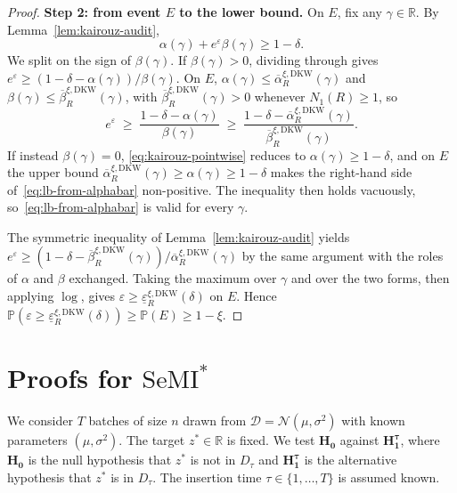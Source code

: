 \documentclass{article}
\theoremstyle{plain}
\theoremstyle{definition}
\theoremstyle{remark}
\newcommand{\RR}{\ensuremath{\mathbb{R}}}
\newcommand{\cN}{\ensuremath{\mathcal{N}}}
\newcommand{\cD}{\ensuremath{\mathcal{D}}}
\renewcommand{\leq}{\leqslant}
\renewcommand{\geq}{\geqslant}
\newcommand{\SeMIstar}{\mathrm{SeMI}^{\ast}}
\newcommand{\bP}{\mathbb{P}}
\begin{document}
\begin{proof}
    \textbf{Step 2: from event $E$ to the lower bound.}
    On $E$, fix any $\gamma \in \RR$. By Lemma~\ref{lem:kairouz-audit},
    \begin{equation}\label{eq:kairouz-pointwise}
        \alpha(\gamma) + e^\varepsilon \beta(\gamma) \geq 1 - \delta.
    \end{equation}
    We split on the sign of $\beta(\gamma)$. If $\beta(\gamma) > 0$, dividing through gives $e^\varepsilon \geq (1-\delta-\alpha(\gamma))/\beta(\gamma)$. On $E$, $\alpha(\gamma) \leq \overline{\alpha}_R^{\xi,\mathrm{DKW}}(\gamma)$ and $\beta(\gamma) \leq \overline{\beta}_R^{\xi,\mathrm{DKW}}(\gamma)$, with $\overline{\beta}_R^{\xi,\mathrm{DKW}}(\gamma) > 0$ whenever $N_1(R) \geq 1$, so
    \begin{equation}\label{eq:lb-from-alphabar}
        e^\varepsilon \;\geq\; \frac{1-\delta-\alpha(\gamma)}{\beta(\gamma)} \;\geq\; \frac{1-\delta-\overline{\alpha}_R^{\xi,\mathrm{DKW}}(\gamma)}{\overline{\beta}_R^{\xi,\mathrm{DKW}}(\gamma)}.
    \end{equation}
    If instead $\beta(\gamma) = 0$, \eqref{eq:kairouz-pointwise} reduces to $\alpha(\gamma) \geq 1-\delta$, and on $E$ the upper bound $\overline{\alpha}_R^{\xi,\mathrm{DKW}}(\gamma) \geq \alpha(\gamma) \geq 1-\delta$ makes the right-hand side of~\eqref{eq:lb-from-alphabar} non-positive. The inequality then holds vacuously, so~\eqref{eq:lb-from-alphabar} is valid for every $\gamma$.

    The symmetric inequality of Lemma~\ref{lem:kairouz-audit} yields $e^\varepsilon \geq (1-\delta-\overline{\beta}_R^{\xi,\mathrm{DKW}}(\gamma))/\overline{\alpha}_R^{\xi,\mathrm{DKW}}(\gamma)$ by the same argument with the roles of $\alpha$ and $\beta$ exchanged. Taking the maximum over $\gamma$ and over the two forms, then applying $\log$, gives $\varepsilon \geq \underline{\varepsilon}_R^{\xi,\mathrm{DKW}}(\delta)$ on $E$. Hence $\bP(\varepsilon \geq \underline{\varepsilon}_R^{\xi,\mathrm{DKW}}(\delta)) \geq \bP(E) \geq 1 - \xi$.
\end{proof}

\section{Proofs for $\SeMIstar$}
\label{app:optimal-test-proofs}

We consider $T$ batches of size $n$ drawn from $\cD = \cN(\mu, \sigma^2)$ with known parameters $(\mu, \sigma^2)$. The target $z^* \in \RR$ is fixed. We test $\mathbf{H_0}$ against $\mathbf{H_1^\tau}$, where $\mathbf{H_0}$ is the null hypothesis that $z^*$ is not in $D_\tau$ and $\mathbf{H_1^\tau}$ is the alternative hypothesis that $z^*$ is in $D_\tau$. The insertion time $\tau \in \{1, \ldots, T\}$ is assumed known.
\end{document}
